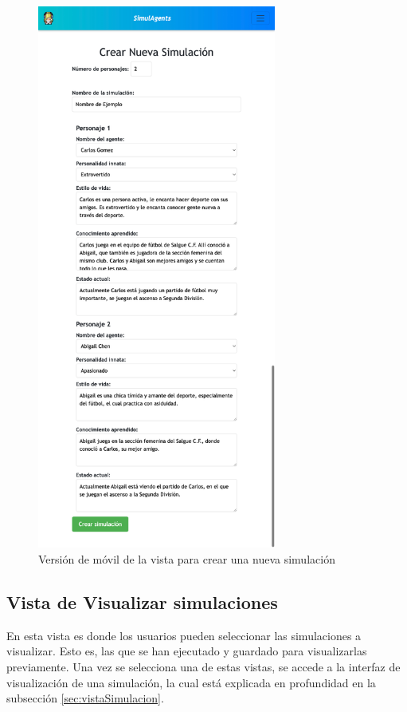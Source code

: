 \begin{figure}[H]
	\centering
	\includegraphics[width = 0.7\textwidth]{Imagenes/Vectorial/crearSimuMobile.png}
	\caption{Versión de móvil de la vista para crear una nueva simulación}
	\label{fig:vistaCrearSimulacionMobile}
\end{figure}

\subsection{Vista de Visualizar simulaciones}
\label{vistaVisSim}

En esta vista es donde los usuarios pueden seleccionar las simulaciones a visualizar. Esto es, las que se han ejecutado y guardado para visualizarlas previamente. Una vez se selecciona una de estas vistas, se accede a la interfaz de visualización de una simulación, la cual está explicada en profundidad en la subsección  \ref{sec:vistaSimulacion}.

